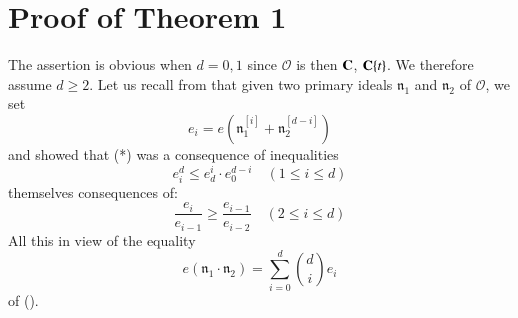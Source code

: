 \section{Proof of Theorem 1}\label{art06-sec2}
The assertion is obvious when $d = 0, 1$ since $\mathcal{O}$ is then $\mathbf{C}$, $\mathbf{C}\{t\}$. We therefore assume $d \geqslant 2$. Let us recall from \cite{art06-keyM.I.} that given two primary ideals $\mathfrak{n}_1$ and $\mathfrak{n}_2$ of $\mathcal{O}$, we set
$$
e_i = e \left(\mathfrak{n}^{[i]}_1 + \mathfrak{n}^{[d-i]}_2 \right)
$$
and showed that (*) was a consequence of inequalities
\begin{equation*}
e^d_i \leqslant e^i_d \cdot e^{d-i}_0 \quad (1 \leqslant i \leqslant d)\tag*{[I.2]}
\end{equation*} 
themselves consequences of:
\begin{equation*}
\frac{e_i}{e_{i-1}} \geqslant \frac{e_{i-1}}{e_{i-2}} \quad (2 \leqslant i \leqslant d)
\tag*{[I.3]}
\end{equation*}
All this in view of the equality
\begin{equation*}
e(\mathfrak{n}_1 \cdot \mathfrak{n}_2)  = \sum\limits^d_{i=0} \binom{d}{i} e_i \tag*{[E.1]}
\end{equation*}
of (\cite[Chap. I \S\ 2]{art06-keyC.E.W.}).


